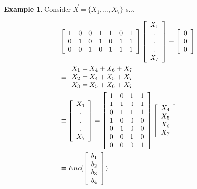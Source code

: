 \documentclass{article}
\theoremstyle{definition} %
\newtheorem{example}{Example}
\begin{document}
\begin{example}
  Consider $\vec{X} = \{ X_1, ..., X_7\}$ s.t.

  \begin{align*}
    &\left[
    \begin{array}{c c c c c c c}
      1 & 0 & 0 & 1 & 1 & 0 & 1 \\
      0 & 1 & 0 & 1 & 0 & 1 & 1 \\
      0 & 0 & 1 & 0 & 1 & 1 & 1
    \end{array}
    \right]
    \left[
    \begin{array}{c}
      X_1 \\
      . \\
      . \\
      . \\
      X_7
    \end{array}
    \right]
    =
    \left[
    \begin{array}{c}
      0 \\
      0 \\
      0
    \end{array}
    \right] \\
    &\equiv
    \begin{array}{l l}
      X_1 = X_4 + X_6 + X_7 \\
      X_2 = X_4 + X_5 + X_7 \\
      X_3 = X_5 + X_6 + X_7
    \end{array}\\
    &\equiv
    \left[
    \begin{array}{c}
      X_1 \\
      . \\
      . \\
      . \\
      X_7
    \end{array}
    \right]
    =
    \left[
    \begin{array}{c c c c}
      1 & 0 & 1 & 1 \\
      1 & 1 & 0 & 1 \\
      0 & 1 & 1 & 1 \\
      1 & 0 & 0 & 0 \\
      0 & 1 & 0 & 0 \\
      0 & 0 & 1 & 0 \\
      0 & 0 & 0 & 1 \\
    \end{array}
    \right]
    \left[
    \begin{array}{c}
      X_4 \\
      X_5 \\
      X_6 \\
      X_7
    \end{array}
    \right] \\
    &\equiv Enc(
    \left[
    \begin{array}{c}
      b_1 \\
      b_2 \\
      b_3 \\
      b_4
    \end{array}
    \right]
    )
  \end{align*}
\end{example}
\end{document}
